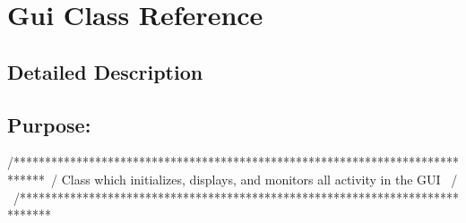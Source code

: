 \hypertarget{class_gui}{}\section{Gui Class Reference}
\label{class_gui}


\subsection{Detailed Description}
\subsection*{{\bfseries Purpose\+:} }

\begin{DoxyVerb}/*****************************************************************************\
/  Class which initializes, displays, and monitors all activity in the GUI    \
/                                                                             \
/*****************************************************************************\
\end{DoxyVerb}


